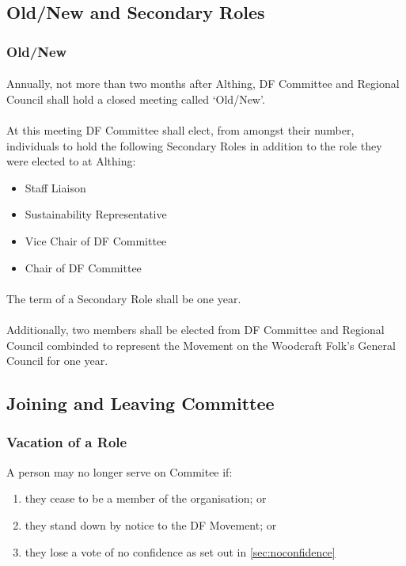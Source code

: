 \documentclass[a4paper, 12pt]{report}
\begin{document}
\subsection{Old/New and Secondary Roles}
\label{sec:secondaryroles}
\subsubsection{Old/New}
\label{sec:oldnew}
\paragraph{} Annually, not more than two months after Althing, DF Committee and Regional Council shall hold a closed meeting called `Old/New'.
\paragraph{} At this meeting DF Committee shall elect, from amongst their number, individuals to hold the following Secondary Roles in addition to the role they were elected to at Althing:
\begin{itemize}
\item Staff Liaison
\item Sustainability Representative
\item Vice Chair of DF Committee
\item Chair of DF Committee
\end{itemize}

\paragraph{} The term of a Secondary Role shall be one year.

\paragraph{} Additionally, two members shall be elected from DF Committee and Regional Council combinded to represent the Movement on the Woodcraft Folk's General Council for one year.

\subsection{Joining and Leaving Committee}
\subsubsection{Vacation of a Role}
A person may no longer serve on Commitee if:
\begin{enumerate}[\hspace{0.5cm}(a)]
\item they cease to be a member of the organisation; or
\item they stand down by notice to the DF Movement; or
\item they lose a vote of no confidence as set out in \ref{sec:noconfidence}
\end{enumerate}
\end{document}
